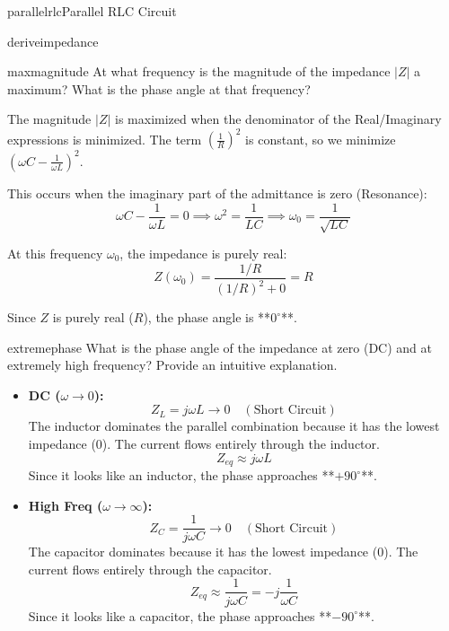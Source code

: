 \begin{mainquestion}{parallelrlc}{Parallel RLC Circuit}
\begin{partquestion}{deriveimpedance}
\end{partquestion}

\begin{partquestion}{maxmagnitude}
{At what frequency is the magnitude of the impedance $|Z|$ a maximum? What is the phase angle at that frequency?}

\begin{answer}[1.5in]
        The magnitude $|Z|$ is maximized when the denominator of the Real/Imaginary expressions is minimized. The term $\left(\frac{1}{R}\right)^2$ is constant, so we minimize $\left(\omega C - \frac{1}{\omega L}\right)^2$.
        
        This occurs when the imaginary part of the admittance is zero (Resonance):
        \[\omega C - \frac{1}{\omega L} = 0 \implies \omega^2 = \frac{1}{LC} \implies \omega_0 = \frac{1}{\sqrt{LC}}\]
        
        At this frequency $\omega_0$, the impedance is purely real:
        \[Z(\omega_0) = \frac{1/R}{(1/R)^2 + 0} = R\]
        
        Since $Z$ is purely real ($R$), the phase angle is **$0^\circ$**.
\end{answer}

\end{partquestion}

\begin{partquestion}{extremephase}
{What is the phase angle of the impedance at zero (DC) and at extremely high frequency? Provide an intuitive explanation.}

\begin{answer}[2in]
        \begin{itemize}
            \item \textbf{DC ($\omega \to 0$):} 
            \[Z_L = j\omega L \to 0 \quad (\text{Short Circuit})\]
            The inductor dominates the parallel combination because it has the lowest impedance (0). The current flows entirely through the inductor.
            \[Z_{eq} \approx j\omega L\]
            Since it looks like an inductor, the phase approaches **$+90^\circ$**.

            \item \textbf{High Freq ($\omega \to \infty$):} 
            \[Z_C = \frac{1}{j\omega C} \to 0 \quad (\text{Short Circuit})\]
            The capacitor dominates because it has the lowest impedance (0). The current flows entirely through the capacitor.
            \[Z_{eq} \approx \frac{1}{j\omega C} = -j\frac{1}{\omega C}\]
            Since it looks like a capacitor, the phase approaches **$-90^\circ$**.
        \end{itemize}
\end{answer}


\end{partquestion}
\end{mainquestion}
